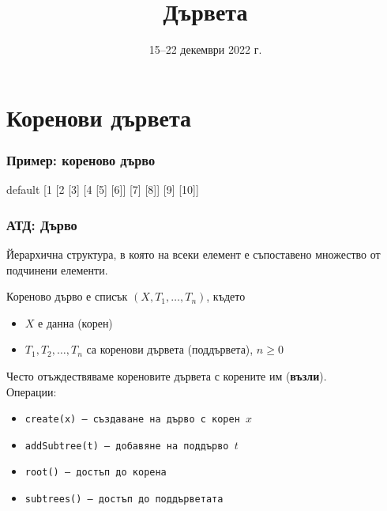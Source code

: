 \documentclass[alsotrans,beameroptions={aspectratio=169}]{beamerswitch}
\title{Дървета}
\date{15--22 декември 2022 г.}
\newcommand{\sampletree}{%
  \begin{forest} default
    [1 [2 [3] [4 [5] [6]] [7] [8]] [9] [10]]
  \end{forest}%
}
\begin{document}
\begin{frame}
  \titlepage
\end{frame}

\section{Коренови дървета}

\begin{frame}
  \frametitle{Пример: кореново дърво}
  \begin{center}
    \sampletree
  \end{center}
\end{frame}

\begin{frame}
  \frametitle{АТД: Дърво}
  Йерархична структура, в която на всеки елемент е съпоставено множество от подчинени елементи.
  \begin{definition}
    Кореново дърво е списък $(X, T_1, \ldots, T_n)$, където
    \begin{itemize}
    \item $X$ е данна (корен)
    \item $T_1, T_2, \ldots, T_n$ са коренови дървета (поддървета)\pause, \alert{$n\geq 0$}
    \end{itemize}
  \end{definition}
  \pause
  Често отъждествяваме кореновите дървета с корените им (\textbf{възли}).\\
  \pause
  Операции:
  \begin{itemize}
  \item \tt{create(x)} --- създаване на дърво с корен $x$
  \item \tt{addSubtree(t)} --- добавяне на поддърво $t$
  \item \tt{root()} --- достъп до корена
  \item \tt{subtrees()} --- достъп до поддърветата
  \end{itemize}
\end{frame}
\end{document}
